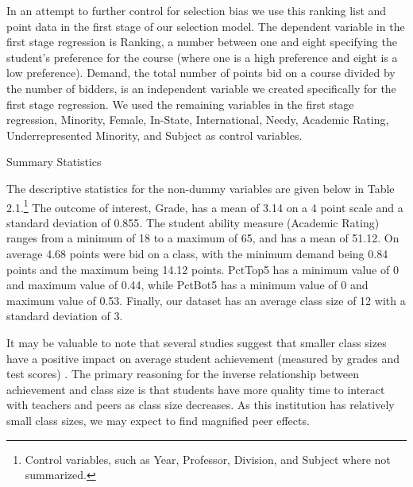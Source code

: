 \documentclass[12pt,a4paper,english,fleqn]{article}
\makeatletter
\renewcommand\subsection{\@startsection{subsection}{2}
{\z@}{-3.25ex\@plus -1ex \@minus -.2ex}{1.5ex \@plus .2ex}{\normalfont\bf}}
\makeatother
\begin{document}
In an attempt to further control for selection bias we use this ranking list and point data in the first stage of our selection model. The dependent variable in the first stage regression is Ranking, a number between one and eight specifying the student's preference for the course (where one is a high preference and eight is a low preference). Demand, the total number of points bid on a course divided by the number of bidders, is an independent variable we created specifically for the first stage regression. We used the remaining variables in the first stage regression, Minority, Female, In-State, International, Needy, Academic Rating, Underrepresented Minority, and Subject as control variables. 

\subsection{Summary Statistics}

The descriptive statistics for the non-dummy variables are given below in Table 2.1.\footnote{Control variables, such as Year, Professor, Division, and Subject where not summarized.} The outcome of interest, Grade, has a mean of 3.14 on a 4 point scale and a standard deviation of 0.855. The student ability measure (Academic Rating) ranges from a minimum of 18 to a maximum of 65, and has a mean of 51.12. On average 4.68 points were bid on a class, with the minimum demand being 0.84 points and the maximum being 14.12 points. PctTop5 has a minimum value of 0 and maximum value of 0.44, while PctBot5 has a minimum value of 0 and maximum value of 0.53. Finally, our dataset has an average class size of 12 with a standard deviation of 3. 

It may be valuable to note that several studies suggest that smaller class sizes have a positive impact on average student achievement (measured by grades and test scores) \citep{diette2015class,kokkelenberg2008effects}. The primary reasoning for the inverse relationship between achievement and class size is that students have more quality time to interact with teachers and peers as class size decreases. As this institution has relatively small class sizes, we may expect to find magnified peer effects. 


\newpage{}





\end{document}
